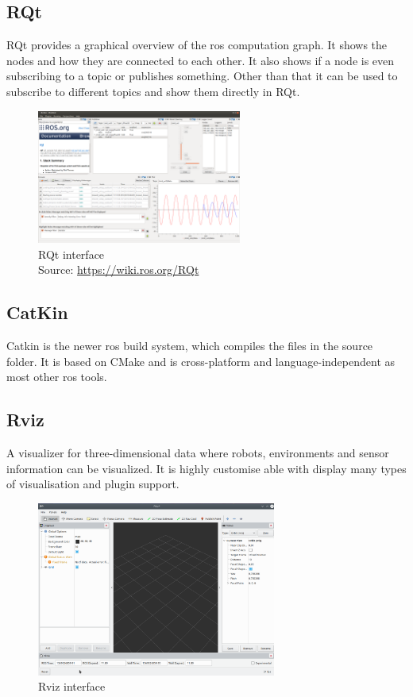 \subsection{RQt}
RQt provides a graphical overview of the \gls{ros} computation graph. It shows the nodes and how they are connected to each other. It also shows if a node is even subscribing to a topic or publishes something. Other than that it can be used to subscribe to different topics and show them directly in RQt.
\begin{figure}[h]
	\centering
	\includegraphics[width=0.6\textwidth]{./media/images/RQt}
  	\caption{RQt interface\\Source: \url{https://wiki.ros.org/RQt}}
  	\label{rqtinterface}
\end{figure}

\subsection{CatKin}
Catkin is the newer \gls{ros} build system, which compiles the files in the source folder. It is based on CMake and is cross-platform and language-independent as most other \gls{ros} tools.

\subsection{Rviz}
A visualizer for three-dimensional data where robots, environments and sensor information can be visualized. It is highly customise able with display many types of visualisation and plugin support. \newline
\begin{figure}[h]
	\centering
	\includegraphics[width=0.7\textwidth]{./media/images/rviz}
  	\caption{Rviz interface}
  	\label{rvizinterface}
\end{figure}

